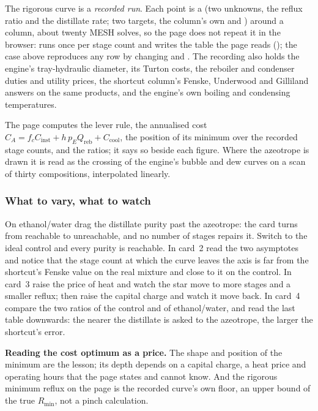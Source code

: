 \documentclass[11pt,a4paper]{article}
\begin{document}
The rigorous curve is a \emph{recorded run}.  Each point is a 
(two unknowns, the reflux ratio and the distillate rate; two targets, the
column's own  and ) around a
 column, about twenty MESH solves, so the page does not
repeat it in the browser:  runs
 once per stage count and writes the table the page reads
(); the case above reproduces any
row by changing  and .  The recording also holds
the engine's tray-hydraulic diameter, its Turton costs, the reboiler and
condenser duties and utility prices, the shortcut column's Fenske, Underwood and
Gilliland answers on the same products, and the engine's own boiling and
condensing temperatures.

The page computes the lever rule, the annualised cost $C_A=f_c C_\mathrm{inst}
+ h\,p_E Q_\mathrm{reb} + C_\mathrm{cool}$, the position of its minimum over the
recorded stage counts, and the ratios; it says so beside each figure.
Where the azeotrope is drawn it is read as the crossing of the engine's bubble
and dew curves on a scan of thirty compositions, interpolated linearly.

\subsubsection*{What to vary, what to watch}

\begin{tryit}
On ethanol/water drag the distillate purity past the azeotrope: the card turns
from reachable to unreachable, and no number of stages repairs it.  Switch to the
ideal control and every purity is reachable.  In card~2 read the two asymptotes
and notice that the stage count at which the curve leaves the axis is far from
the shortcut's Fenske value on the real mixture and close to it on the control.
In card~3 raise the price of heat and watch the star move to more stages and a
smaller reflux; then raise the capital charge and watch it move back.  In card~4
compare the two ratios of the control and of ethanol/water, and read the last
table downwards: the nearer the distillate is asked to the azeotrope, the larger
the shortcut's error.
\end{tryit}

\begin{pitfall}
\textbf{Reading the cost optimum as a price.}  The shape and position of the
minimum are the lesson; its depth depends on a capital charge, a heat price and
operating hours that the page states and cannot know.  And the rigorous minimum
reflux on the page is the recorded curve's own floor, an upper bound of the true
$R_\mathrm{min}$, not a pinch calculation.
\end{pitfall}
\end{document}
